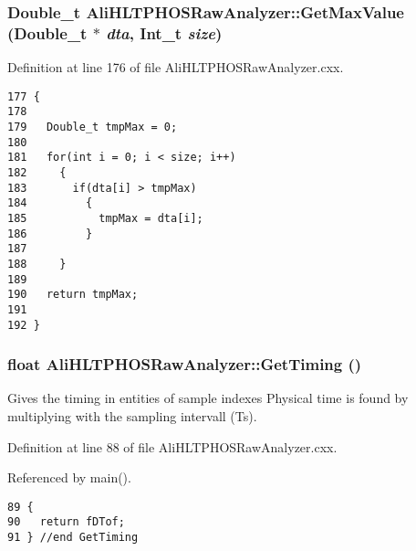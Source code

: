 \subsubsection{\setlength{\rightskip}{0pt plus 5cm}Double\_\-t Ali\-HLTPHOSRaw\-Analyzer::Get\-Max\-Value (Double\_\-t $\ast$ {\em dta}, Int\_\-t {\em size})\hspace{0.3cm}{\tt  [inherited]}}\label{classAliHLTPHOSRawAnalyzer_AliHLTPHOSRawAnalyzerPeakFindera18}




Definition at line 176 of file Ali\-HLTPHOSRaw\-Analyzer.cxx.

\footnotesize\begin{verbatim}177 {
178 
179   Double_t tmpMax = 0;
180 
181   for(int i = 0; i < size; i++)
182     {
183       if(dta[i] > tmpMax)
184         {
185           tmpMax = dta[i];
186         }
187 
188     }
189   
190   return tmpMax;
191 
192 }
\end{verbatim}\normalsize 


\subsubsection{\setlength{\rightskip}{0pt plus 5cm}float Ali\-HLTPHOSRaw\-Analyzer::Get\-Timing ()\hspace{0.3cm}{\tt  [inherited]}}\label{classAliHLTPHOSRawAnalyzer_AliHLTPHOSRawAnalyzerPeakFindera10}


Gives the timing in entities of sample indexes Physical time is found by multiplying with the sampling intervall (Ts). 

Definition at line 88 of file Ali\-HLTPHOSRaw\-Analyzer.cxx.

Referenced by main().

\footnotesize\begin{verbatim}89 {
90   return fDTof;
91 } //end GetTiming
\end{verbatim}\normalsize 


